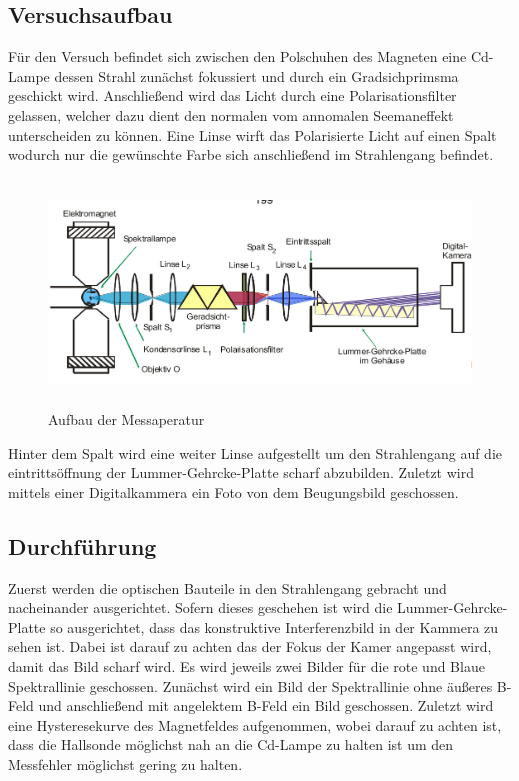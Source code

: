 \subsection{Versuchsaufbau}
Für den Versuch befindet sich zwischen den Polschuhen des Magneten eine Cd-Lampe dessen Strahl zunächst fokussiert und durch ein Gradsichprimsma geschickt wird. Anschließend wird das Licht durch eine Polarisationsfilter gelassen, welcher dazu dient den normalen vom annomalen Seemaneffekt unterscheiden zu können. Eine Linse wirft das Polarisierte Licht auf einen Spalt wodurch nur die gewünschte Farbe sich anschließend im Strahlengang befindet. 
\begin{figure}[H]
  \centering
  \includegraphics[height=6cm]{Bilder/Aufbau.png}
  \caption{Aufbau der Messaperatur}
  \label{fig:<+label+>}
\end{figure}
Hinter dem Spalt wird eine weiter Linse aufgestellt um den Strahlengang auf die eintrittsöffnung der Lummer-Gehrcke-Platte scharf abzubilden. Zuletzt wird mittels einer Digitalkammera ein Foto von dem Beugungsbild geschossen.

\subsection{Durchführung}
Zuerst werden die optischen Bauteile in den Strahlengang gebracht und nacheinander ausgerichtet. Sofern dieses geschehen ist wird die Lummer-Gehrcke-Platte so ausgerichtet, dass das konstruktive Interferenzbild in der Kammera zu sehen ist. Dabei ist darauf zu achten das der Fokus der Kamer angepasst wird, damit das Bild scharf wird. Es wird jeweils zwei Bilder für die rote und Blaue Spektrallinie geschossen. Zunächst wird ein Bild der Spektrallinie ohne äußeres B-Feld und anschließend mit angelektem B-Feld ein Bild geschossen. Zuletzt wird eine Hysteresekurve des Magnetfeldes aufgenommen, wobei darauf zu achten ist, dass die Hallsonde möglichst nah an die Cd-Lampe zu halten ist um den Messfehler möglichst gering zu halten.
